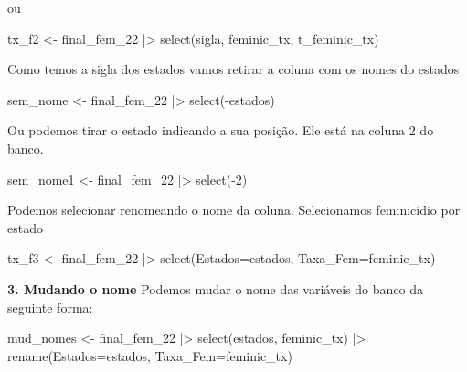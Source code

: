 \documentclass[
  letterpaper,
  DIV=11,
  numbers=noendperiod]{scrreprt}
\newenvironment{Shaded}{\begin{snugshade}}{\end{snugshade}}
\newcommand{\AttributeTok}[1]{\textcolor[rgb]{0.40,0.45,0.13}{#1}}
\newcommand{\DecValTok}[1]{\textcolor[rgb]{0.68,0.00,0.00}{#1}}
\newcommand{\FunctionTok}[1]{\textcolor[rgb]{0.28,0.35,0.67}{#1}}
\newcommand{\NormalTok}[1]{\textcolor[rgb]{0.00,0.23,0.31}{#1}}
\newcommand{\OtherTok}[1]{\textcolor[rgb]{0.00,0.23,0.31}{#1}}
\newcommand{\SpecialCharTok}[1]{\textcolor[rgb]{0.37,0.37,0.37}{#1}}
\begin{document}
ou

\begin{Shaded}
\begin{Highlighting}[]
\NormalTok{tx\_f2 }\OtherTok{\textless{}{-}}\NormalTok{ final\_fem\_22 }\SpecialCharTok{|\textgreater{}} 
  \FunctionTok{select}\NormalTok{(sigla, feminic\_tx, t\_feminic\_tx)}
\end{Highlighting}
\end{Shaded}

Como temos a sigla dos estados vamos retirar a coluna com os nomes do
estados

\begin{Shaded}
\begin{Highlighting}[]
\NormalTok{sem\_nome }\OtherTok{\textless{}{-}}\NormalTok{ final\_fem\_22 }\SpecialCharTok{|\textgreater{}} 
  \FunctionTok{select}\NormalTok{(}\SpecialCharTok{{-}}\NormalTok{estados)}
\end{Highlighting}
\end{Shaded}

Ou podemos tirar o estado indicando a sua posição. Ele está na coluna 2
do banco.

\begin{Shaded}
\begin{Highlighting}[]
\NormalTok{sem\_nome1 }\OtherTok{\textless{}{-}}\NormalTok{ final\_fem\_22 }\SpecialCharTok{|\textgreater{}} 
  \FunctionTok{select}\NormalTok{(}\SpecialCharTok{{-}}\DecValTok{2}\NormalTok{)}
\end{Highlighting}
\end{Shaded}

Podemos selecionar renomeando o nome da coluna. Selecionamos feminicídio
por estado

\begin{Shaded}
\begin{Highlighting}[]
\NormalTok{tx\_f3 }\OtherTok{\textless{}{-}}\NormalTok{ final\_fem\_22 }\SpecialCharTok{|\textgreater{}} 
  \FunctionTok{select}\NormalTok{(}\AttributeTok{Estados=}\NormalTok{estados, }\AttributeTok{Taxa\_Fem=}\NormalTok{feminic\_tx)}
\end{Highlighting}
\end{Shaded}

\textbf{3. Mudando o nome} Podemos mudar o nome das variáveis do banco
da seguinte forma:

\begin{Shaded}
\begin{Highlighting}[]
\NormalTok{mud\_nomes }\OtherTok{\textless{}{-}}\NormalTok{ final\_fem\_22 }\SpecialCharTok{|\textgreater{}} 
  \FunctionTok{select}\NormalTok{(estados, feminic\_tx) }\SpecialCharTok{|\textgreater{}} 
  \FunctionTok{rename}\NormalTok{(}\AttributeTok{Estados=}\NormalTok{estados, }\AttributeTok{Taxa\_Fem=}\NormalTok{feminic\_tx)}
\end{Highlighting}
\end{Shaded}
\end{document}
